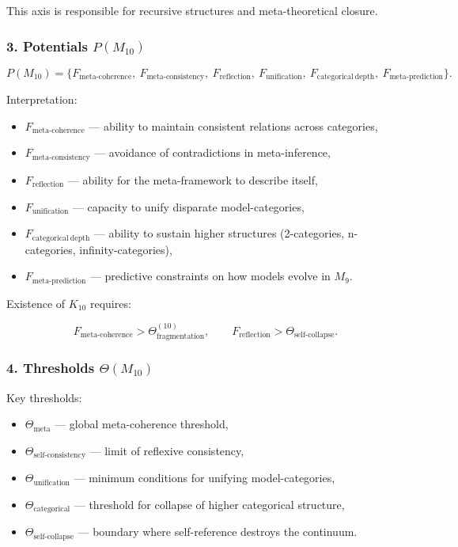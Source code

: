 This axis is responsible for recursive structures and
meta-theoretical closure.

\subsubsection*{3. Potentials $P(M_{10})$}

\[
P(M_{10}) =
\{
F_{\mathrm{meta\mbox{-}coherence}},\
F_{\mathrm{meta\mbox{-}consistency}},\
F_{\mathrm{reflection}},\
F_{\mathrm{unification}},\
F_{\mathrm{categorical\ depth}},\
F_{\mathrm{meta\mbox{-}prediction}}
\}.
\]

Interpretation:

\begin{itemize}
    \item $F_{\mathrm{meta\mbox{-}coherence}}$ — ability to maintain
        consistent relations across categories,
    \item $F_{\mathrm{meta\mbox{-}consistency}}$ — avoidance of
        contradictions in meta-inference,
    \item $F_{\mathrm{reflection}}$ — ability for the meta-framework to describe itself,
    \item $F_{\mathrm{unification}}$ — capacity to unify disparate model-categories,
    \item $F_{\mathrm{categorical\ depth}}$ — ability to sustain higher structures
        (2-categories, n-categories, infinity-categories),
    \item $F_{\mathrm{meta\mbox{-}prediction}}$ — predictive constraints on
        how models evolve in $M_9$.
\end{itemize}

Existence of $K_{10}$ requires:

\[
F_{\mathrm{meta\mbox{-}coherence}}>\Theta_{\mathrm{fragmentation}}^{(10)},
\qquad
F_{\mathrm{reflection}}>\Theta_{\mathrm{self\mbox{-}collapse}}.
\]

\subsubsection*{4. Thresholds $\Theta(M_{10})$}

Key thresholds:

\begin{itemize}
    \item $\Theta_{\mathrm{meta}}$ — global meta-coherence threshold,
    \item $\Theta_{\mathrm{self\mbox{-}consistency}}$ — limit of reflexive consistency,
    \item $\Theta_{\mathrm{unification}}$ — minimum conditions for unifying model-categories,
    \item $\Theta_{\mathrm{categorical}}$ — threshold for collapse of higher categorical structure,
    \item $\Theta_{\mathrm{self\mbox{-}collapse}}$ — boundary where self-reference
        destroys the continuum.
\end{itemize}

